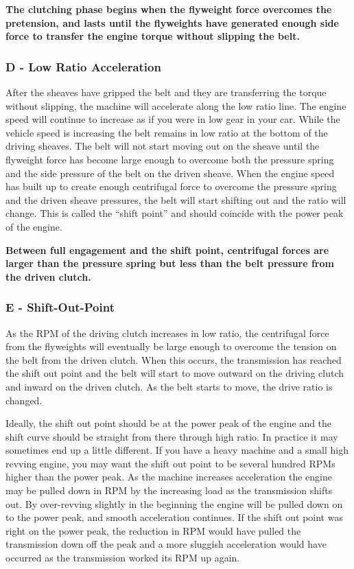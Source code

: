 \documentclass[12pt, titlepage]{article}
\begin{document}
\textbf{The clutching phase begins when the flyweight force overcomes the pretension, and lasts until the flyweights have generated enough side force to transfer the engine torque without slipping the belt.}

\subsubsection*{D - Low Ratio Acceleration}

After the sheaves have gripped the belt and they are transferring the torque without slipping, the machine will accelerate along the low ratio line. The engine speed will continue to increase as if you were in low gear in your car. While the vehicle speed is increasing the belt remains in low ratio at the bottom of the driving sheaves. The belt will not start moving out on the sheave until the flyweight force has become large enough to overcome both the pressure spring and the side pressure of the belt on the driven sheave. When the engine speed has built up to create enough centrifugal force to overcome the pressure spring and the driven sheave pressures, the belt will start shifting out and the ratio will change. This is called the “shift point” and should coincide with the power peak of the engine.

\textbf{Between full engagement and the shift point, centrifugal forces are larger than the pressure spring but less than the belt pressure from the driven clutch.}

\subsubsection*{E - Shift-Out-Point}
As the RPM of the driving clutch increases in low ratio, the centrifugal force from the flyweights will eventually be large enough to overcome the tension on the belt from the driven clutch. When this occurs, the transmission has reached the shift out point and the belt will start to move outward on the driving clutch and inward on the driven clutch. As the belt starts to move, the drive ratio is changed.

Ideally, the shift out point should be at the power peak of the engine and the shift curve should be straight from there through high ratio. In practice it may sometimes end up a little different. If you have a heavy machine and a small high revving engine, you may want the shift out point to be several hundred RPMs higher than the power peak. As the machine increases acceleration the engine may be pulled down in RPM by the increasing load as the transmission shifts out. By over-revving slightly in the beginning the engine will be pulled down on to the power peak, and smooth acceleration continues. If the shift out point was right on the power peak, the reduction in RPM would have pulled the transmission down off the peak and a more sluggish acceleration would have occurred as the transmission worked its RPM up again.
\end{document}
